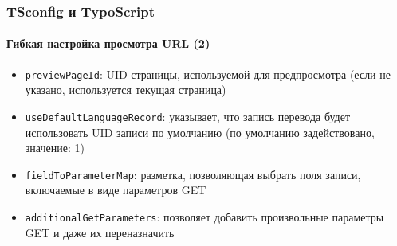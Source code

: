 \begin{frame}[fragile]
	\frametitle{TSconfig и TypoScript}
	\framesubtitle{Гибкая настройка просмотра URL (2)}

	\begin{itemize}
		\item \texttt{previewPageId}:\newline
			\smaller
				UID страницы, используемой для предпросмотра\newline
				(если не указано, используется текущая страница)
			\normalsize
		\item \texttt{useDefaultLanguageRecord}:\newline
			\smaller
				указывает, что запись перевода будет использовать UID записи по умолчанию\newline
				(по умолчанию задействовано, значение: 1)
			\normalsize
		\item \texttt{fieldToParameterMap}:\newline
			\smaller
				разметка, позволяющая выбрать поля записи, включаемые в виде параметров GET
			\normalsize
		\item \texttt{additionalGetParameters}:\newline
			\smaller
				позволяет добавить произвольные параметры GET и даже их переназначить
			\normalsize
	\end{itemize}

\end{frame}

